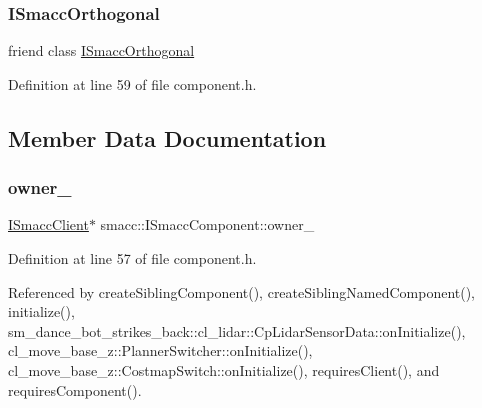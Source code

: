 \subsubsection{\texorpdfstring{I\+Smacc\+Orthogonal}{ISmaccOrthogonal}}
{\footnotesize\ttfamily friend class \hyperlink{classsmacc_1_1ISmaccOrthogonal}{I\+Smacc\+Orthogonal}\hspace{0.3cm}{\ttfamily [friend]}}



Definition at line 59 of file component.\+h.



\subsection{Member Data Documentation}
\mbox{\label{classsmacc_1_1ISmaccComponent_a909590e672450ce0eb0d8facb45c737a}} 
\subsubsection{\texorpdfstring{owner\+\_\+}{owner\_}}
{\footnotesize\ttfamily \hyperlink{classsmacc_1_1ISmaccClient}{I\+Smacc\+Client}$\ast$ smacc\+::\+I\+Smacc\+Component\+::owner\+\_\+\hspace{0.3cm}{\ttfamily [protected]}}



Definition at line 57 of file component.\+h.



Referenced by create\+Sibling\+Component(), create\+Sibling\+Named\+Component(), initialize(), sm\+\_\+dance\+\_\+bot\+\_\+strikes\+\_\+back\+::cl\+\_\+lidar\+::\+Cp\+Lidar\+Sensor\+Data\+::on\+Initialize(), cl\+\_\+move\+\_\+base\+\_\+z\+::\+Planner\+Switcher\+::on\+Initialize(), cl\+\_\+move\+\_\+base\+\_\+z\+::\+Costmap\+Switch\+::on\+Initialize(), requires\+Client(), and requires\+Component().

\mbox{\label{classsmacc_1_1ISmaccComponent_ae3f37acc1679f79299b86872d4b1f80f}} 
